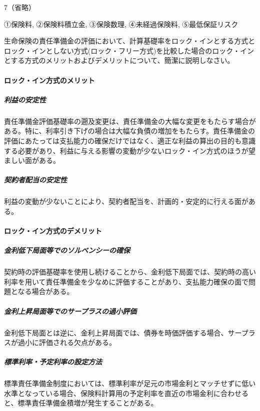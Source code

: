 \documentclass[report,gutter=10mm,fore-edge=10mm,uplatex,dvipdfmx]{jlreq}
\begin{document}
7（省略）



①保険料, ②保険料積立金, ③保険数理, ④未経過保険料, ⑤最低保証リスク


生命保険の責任準備金の評価において、計算基礎率をロック・インとする方式とロック・インとしない方式(ロック・フリー方式)を比較した場合のロック・インとする方式のメリットおよびデメリットについて、簡潔に説明しなさい。


\paragraph{ロック・イン方式のメリット}

\subparagraph{利益の安定性}

責任準備金評価基礎率の遡及変更は、責任準備金の大幅な変更をもたらす場合がある。特に、利率引き下げの場合は大幅な負債の増加をもたらす。責任準備金の評価にあたっては支払能力の確保だけではなく、適正な利益の算出の目的も意識する必要があり、利益に与える影響の変動が少ないロック・イン方式のほうが望ましい面がある。

\subparagraph{契約者配当の安定性}

利益の変動が少ないことにより、契約者配当を、計画的・安定的に行える面がある。

\paragraph{ロック・イン方式のデメリット}

\subparagraph{金利低下局面等でのソルベンシーの確保}

契約時の評価基礎率を使用し続けることから、金利低下局面では、契約時の高い利率を用いて責任準備金を少なめに評価することがあり、支払能力確保の面で問題となる場合がある。

\subparagraph{金利上昇局面等でのサープラスの過小評価}

金利低下局面とは逆に、金利上昇局面では、債券を時価評価する場合、サープラスが過小に評価される欠点がある。

\subparagraph{標準利率・予定利率の設定方法}

標準責任準備金制度においては、標準利率が足元の市場金利とマッチせずに低い水準となっている場合、保険料計算用の予定利率を直近の市場金利に合わせると、標準責任準備金積増が発生することがある。
\end{document}
